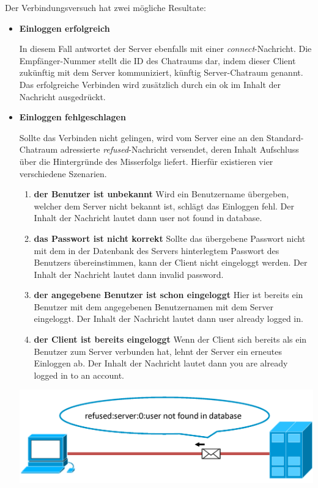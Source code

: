 \documentclass[12pt,a4paper,bibliography=totocnumbered,listof=totocnumbered]{scrartcl}
\begin{document}
Der Verbindungsversuch hat zwei mögliche Resultate:
\begin{itemize}
	\item \textbf{Einloggen erfolgreich}
	
	In diesem Fall antwortet der Server ebenfalls mit einer \textit{connect}-Nachricht. Die Empfänger-Nummer stellt die ID des Chatraums dar, indem dieser Client zukünftig mit dem Server kommuniziert, künftig Server-Chatraum genannt. Das erfolgreiche Verbinden wird zusätzlich durch ein \glqq ok\grqq{} im Inhalt der Nachricht ausgedrückt.
	\item \textbf{Einloggen fehlgeschlagen}
	
	Sollte das Verbinden nicht gelingen, wird vom Server eine an den Standard-Chatraum adressierte \textit{refused}-Nachricht versendet, deren Inhalt Aufschluss über die Hintergründe des Misserfolgs liefert. Hierfür existieren vier verschiedene Szenarien.
	\begin{enumerate}
		\item \textbf{der Benutzer ist unbekannt} \newline
			Wird ein Benutzername übergeben, welcher dem Server nicht bekannt ist, schlägt das Einloggen fehl. Der Inhalt der Nachricht lautet dann \glqq user not found in database\grqq{}. 	
		\item \textbf{das Passwort ist nicht korrekt} \newline
			Sollte das übergebene Passwort nicht mit dem in der Datenbank des Servers hinterlegtem Passwort des Benutzers übereinstimmen, kann der Client nicht eingeloggt werden. Der Inhalt der Nachricht lautet dann \glqq invalid password\grqq{}.
		\item \textbf{der angegebene Benutzer ist schon eingeloggt} \newline
			Hier ist bereits ein Benutzer mit dem angegebenen Benutzernamen mit dem Server eingeloggt. Der Inhalt der Nachricht lautet dann \glqq user already logged in\grqq.
		\item \textbf{der Client ist bereits eingeloggt} \newline
		    Wenn der Client sich bereits als ein Benutzer zum Server verbunden hat, lehnt der Server ein erneutes Einloggen ab. Der Inhalt der Nachricht lautet dann \glqq you are already logged in to an account\grqq.
	\end{enumerate}
	
		\vspace{1em}
		\begin{minipage}{\linewidth}
			\centering
			\includegraphics[width=0.7\linewidth]{img/connect2.png}
			\label{fig:connect2}
		\end{minipage}
	
\end{itemize}
\end{document}
